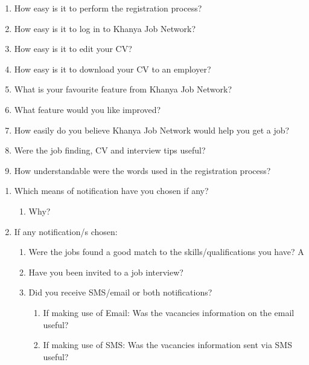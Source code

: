 

\begin{enumerate}
\item How easy is it to perform the registration process?
\item How easy is it to log in to Khanya Job Network?
\item How easy is it to edit your CV?
\item How easy is it to download your CV to an employer?
\item What is your favourite feature from Khanya Job Network?
\item What feature would you like improved?
\item How easily do you believe Khanya Job Network would help you get a job?
\item Were the job finding, CV and interview tips useful?
\item How understandable were the words used in the registration process?
\end{enumerate}



\begin{enumerate}
\item Which means of notification have you chosen if any?
\begin{enumerate}\item Why?\end{enumerate}
\item If any notification/s chosen:

\begin{enumerate}
\item Were the jobs found a good match to the skills/qualifications you have? A
\item Have you been invited to a job interview?
\item Did you receive SMS/email or both notifications?
\begin{enumerate}
\item If making use of Email: Was the vacancies information on the email useful?
\item If making use of SMS: Was the vacancies information sent via SMS useful?
\end{enumerate}
\end{enumerate}
\end{enumerate}